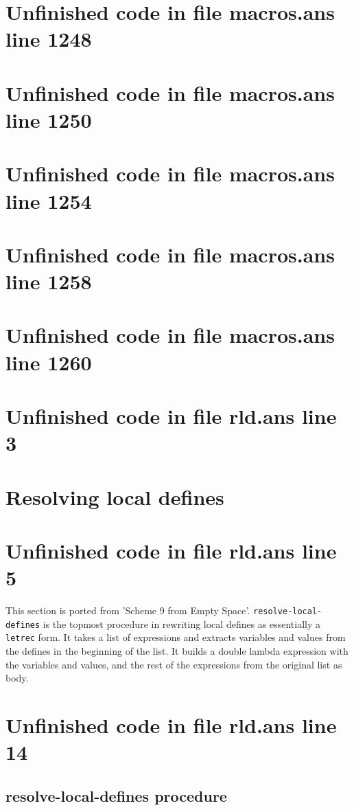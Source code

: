 \documentclass[twoside,9pt]{report}
\begin{document}
\section{Unfinished code in file macros.ans line 1248}
\section{Unfinished code in file macros.ans line 1250}
\section{Unfinished code in file macros.ans line 1254}
\section{Unfinished code in file macros.ans line 1258}
\section{Unfinished code in file macros.ans line 1260}
\section{Unfinished code in file rld.ans line 3}
\section{Resolving local defines}
\label{resolving-local-defines}
\section{Unfinished code in file rld.ans line 5}


This section is ported from 'Scheme 9 from Empty Space'. \texttt{resolve-local-defines} is the topmost procedure in rewriting local defines as essentially a \texttt{letrec} form. It takes a list of expressions and extracts variables and values from the defines in the beginning of the list. It builds a double lambda expression with the variables and values, and the rest of the expressions from the original list as body.

\section{Unfinished code in file rld.ans line 14}
\subsection{resolve-local-defines procedure}
\label{resolve-local-defines-procedure}
\end{document}
